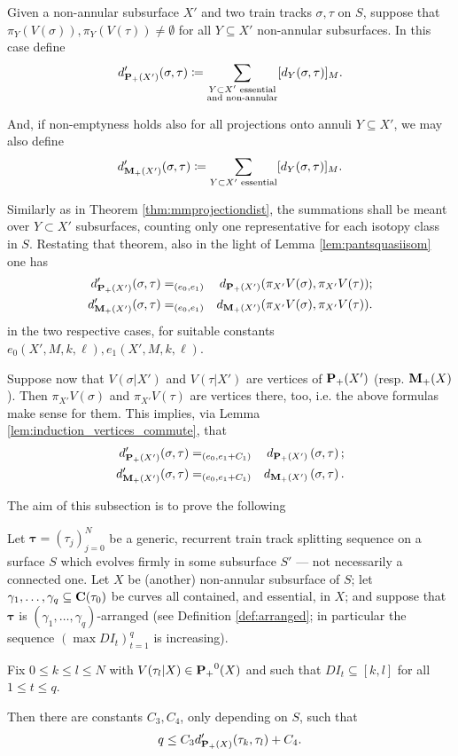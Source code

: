 Given a non-annular subsurface $X'$ and two train tracks $\sigma,\tau$ on $S$, suppose that $\pi_Y\left(V(\sigma)\right),\pi_Y\left(V(\tau)\right)\not=\emptyset$ for all $Y\subseteq X'$ non-annular subsurfaces. In this case define
$$d'_{{\mathbf{P}_+}(X')}(\sigma,\tau)\coloneqq \sum_{\substack{Y\subset X'\text{ essential} \\ \text{and non-annular}}} [d_Y(\sigma,\tau)]_M.$$

And, if non-emptyness holds also for all projections onto annuli $Y\subseteq X'$, we may also define
$$d'_{{\mathbf{M}_+}(X')}(\sigma,\tau)\coloneqq \sum_{Y\subset X'\text{ essential}} [d_Y(\sigma,\tau)]_M.$$

Similarly as in Theorem \ref{thm:mmprojectiondist}, the summations shall be meant over $Y\subset X'$ subsurfaces, counting only one representative for each isotopy class in $S$. Restating that theorem, also in the light of Lemma \ref{lem:pantsquasiisom} one has
\begin{eqnarray*}
d'_{{\mathbf{P}_+}(X')}(\sigma,\tau)  & =_{(e_0,e_1)} &
d_{{\mathbf{P}_+}(X')}(\pi_{X'} V(\sigma), \pi_{X'} V(\tau)); \\
d'_{{\mathbf{M}_+}(X')}(\sigma,\tau)  & =_{(e_0,e_1)} & 
d_{{\mathbf{M}_+}(X')}(\pi_{X'} V(\sigma), \pi_{X'} V(\tau)).
\end{eqnarray*}
in the two respective cases, for suitable constants $e_0(X',M, k,\ell), e_1(X',M, k,\ell)$. 

Suppose now that $V(\sigma|X')$ and $V(\tau|X')$ are vertices of ${\mathbf{P}_+}(X')$ (resp. ${\mathbf{M}_+}(X)$). Then $\pi_{X'} V(\sigma)$ and $\pi_{X'} V(\tau)$ are vertices there, too, i.e. the above formulas make sense for them. This implies, via Lemma \ref{lem:induction_vertices_commute}, that
\begin{eqnarray*}
d'_{{\mathbf{P}_+}(X')}(\sigma,\tau) & =_{(e_0,e_1+ C_1)} &
d_{{\mathbf{P}_+}(X')}\left(\sigma, \tau\right); \\
d'_{{\mathbf{M}_+}(X')}(\sigma,\tau) & =_{(e_0,e_1+ C_1)} &
d_{{\mathbf{M}_+}(X')}\left(\sigma, \tau\right).
\end{eqnarray*}

The aim of this subsection is to prove the following
\begin{prop}\label{prp:tcbound}
Let $\bm\tau=(\tau_j)_{j=0}^N$ be a generic, recurrent train track splitting sequence on a surface $S$ which evolves firmly in some subsurface $S'$ --- not necessarily a connected one. Let $X$ be (another) non-annular subsurface of $S$; let $\gamma_1,\ldots,\gamma_q\subseteq \mathbf C(\tau_0)$ be curves all contained, and essential, in $X$; and suppose that $\bm\tau$ is $(\gamma_1,\ldots,\gamma_q)$-arranged (see Definition \ref{def:arranged}; in particular the sequence $(\max DI_t)_{t=1}^q$ is increasing).

Fix $0\leq k\leq l\leq N$ with $V(\tau_l|X)\in{\mathbf{P}_+}^0(X)$ and such that $DI_t \subseteq [k,l]$ for all $1\leq t \leq q$. 

Then there are constants $C_3, C_4$, only depending on $S$, such that
$$q\leq C_3 d'_{{\mathbf{P}_+}(X)}(\tau_k,\tau_l) + C_4.$$
\end{prop}

